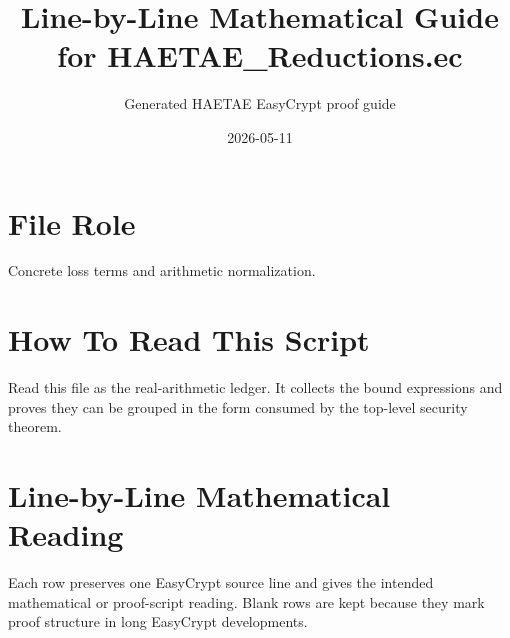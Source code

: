 \documentclass[10pt]{article}
\title{Line-by-Line Mathematical Guide for HAETAE\_Reductions.ec}
\author{Generated HAETAE EasyCrypt proof guide}
\date{2026-05-11}
\begin{document}
\maketitle

\section*{File Role}
Concrete loss terms and arithmetic normalization.

\section*{How To Read This Script}
Read this file as the real-arithmetic ledger.  It collects the bound expressions and proves they can be grouped in the form consumed by the top-level security theorem.

\section*{Line-by-Line Mathematical Reading}
Each row preserves one EasyCrypt source line and gives the intended mathematical
or proof-script reading.  Blank rows are kept because they mark proof structure
in long EasyCrypt developments.
\end{document}
